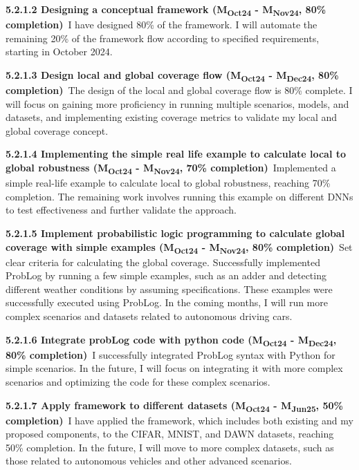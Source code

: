 \noindent \textbf{5.2.1.2 Designing a conceptual framework (M\textsubscript{Oct24} - M\textsubscript{Nov24}, 80\% completion)}\ I have designed 80\% of the framework. I will automate the remaining 20\% of the framework flow according to specified requirements, starting in October 2024.

\noindent \textbf{5.2.1.3 Design local and global coverage flow (M\textsubscript{Oct24} - M\textsubscript{Dec24}, 80\% completion)}\ The design of the local and global coverage flow is 80\% complete. I will focus on gaining more proficiency in running multiple scenarios, models, and datasets, and implementing existing coverage metrics to validate my local and global coverage concept.

\noindent \textbf{5.2.1.4 Implementing the simple real life example to calculate local to global robustness (M\textsubscript{Oct24} - M\textsubscript{Nov24}, 70\% completion)}\ Implemented a simple real-life example to calculate local to global robustness, reaching 70\% completion. The remaining work involves running this example on different DNNs to test effectiveness and further validate the approach.

\noindent \textbf{5.2.1.5 Implement probabilistic logic programming to calculate global coverage with simple examples (M\textsubscript{Oct24} - M\textsubscript{Nov24}, 80\% completion)}\ Set clear criteria for calculating the global coverage. Successfully implemented ProbLog by running a few simple examples, such as an adder and detecting different weather conditions by assuming specifications. These examples were successfully executed using ProbLog. In the coming months, I will run more complex scenarios and datasets related to autonomous driving cars.

\noindent \textbf{5.2.1.6 Integrate probLog code with python code (M\textsubscript{Oct24} - M\textsubscript{Dec24}, 80\% completion)}\ I successfully integrated ProbLog syntax with Python for simple scenarios. In the future, I will focus on integrating it with more complex scenarios and optimizing the code for these complex scenarios.

\noindent \textbf{5.2.1.7 Apply framework to different datasets (M\textsubscript{Oct24} - M\textsubscript{Jun25}, 50\% completion)}\ I have applied the framework, which includes both existing and my proposed components, to the CIFAR, MNIST, and DAWN datasets, reaching 50\% completion. In the future, I will move to more complex datasets, such as those related to autonomous vehicles and other advanced scenarios.

